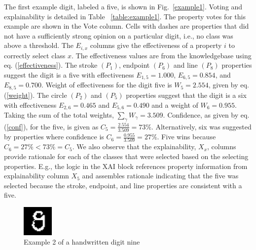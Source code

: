 \documentclass[conference]{IEEEtran}
\begin{document}
The first example  digit, labeled a five, is shown in Fig.~\ref{example1}.  Voting and explainability is detailed in Table ~\ref{table:example1}.  The property votes for this example are shown in the Vote column.  Cells with dashes are properties that did not have a sufficiently strong opinion on a particular digit, i.e., no class was above a threshold.   The $E_{i,x}$ columns give the effectiveness of a property $i$ to correctly select class $x$.  The effectiveness values are from the knowledgebase using eq. (\ref{effectiveness}).   The stroke $(P_1)$, endpoint $(P_6)$ and line $(P_8)$ properties suggest the digit is a five with effectiveness $E_{1,5}= 1.000$, $E_{6,5}=0.854$, and $E_{8,5}=0.700$.  Weight of effectiveness for the digit five is $W_5=2.554$, given by eq. (\ref{weight}).  The circle $(P_2)$ and $(P_5)$ properties suggest that the digit is a six with effectiveness $E_{2,6}=0.465$ and $E_{5,6}=0.490$  and a weight of $W_6=0.955$.  Taking the sum of the total weights, $\sum\limits_\gamma W_\gamma=3.509$.  Confidence, as given by eq. (\ref{conf}), for the five, is given as $C_5=\frac{2.554}{3.509} = 73\%$.  Alternatively, six was suggested by properties where confidence is $C_6=\frac{0.955}{3.509}=27\%$.  Five wins because $C_6=27\% < 73\%=C_5$.  We also observe that the explainability, $X_x$, columns provide rationale for each of the classes that were selected based on the selecting properties.   E.g.,  the logic in the XAI block references property information from explainability column $X_5$ and assembles rationale indicating that the five was selected because the stroke, endpoint, and line properties are consistent with a five. 

 \begin{figure}[htbp]
\centerline{\includegraphics[width=15mm]{./digit-images/9-9.png}}
\caption{Example 2 of a handwritten digit nine}
\label{example2}
\end{figure}

\end{document}
